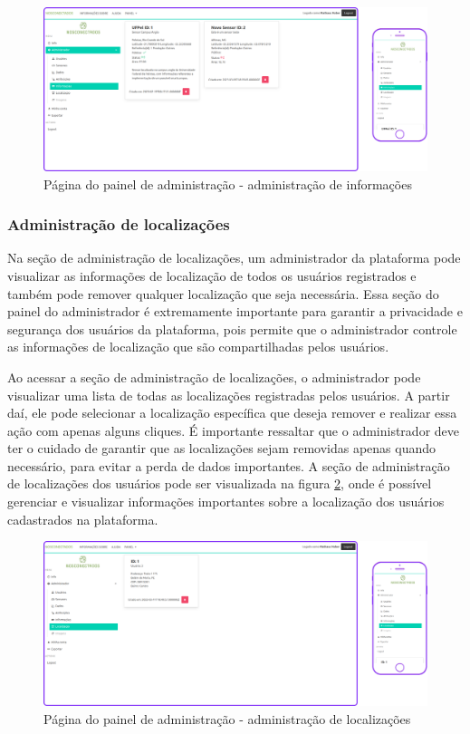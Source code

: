 \documentclass[tcc,capa]{texufpel}
\begin{document}
\begin{figure}[htbp]
  \centering \includegraphics[scale=.2]{assets/painelinformacoes.png}
  \caption{Página do painel de administração - administração de informações}
  \label{admin_informacoes}
\end{figure}
\subsubsection{Administração de localizações}
Na seção de administração de localizações, um administrador da plataforma pode visualizar as informações de localização de todos os usuários registrados e também pode remover qualquer localização que seja necessária. Essa seção do painel do administrador é extremamente importante para garantir a privacidade e segurança dos usuários da plataforma, pois permite que o administrador controle as informações de localização que são compartilhadas pelos usuários.

Ao acessar a seção de administração de localizações, o administrador pode visualizar uma lista de todas as localizações registradas pelos usuários. A partir daí, ele pode selecionar a localização específica que deseja remover e realizar essa ação com apenas alguns cliques. É importante ressaltar que o administrador deve ter o cuidado de garantir que as localizações sejam removidas apenas quando necessário, para evitar a perda de dados importantes. A seção de administração de localizações dos usuários pode ser visualizada na figura \ref{admin_localizacoes}, onde é possível gerenciar e visualizar informações importantes sobre a localização dos usuários cadastrados na plataforma.
\begin{figure}[htbp]
  \centering \includegraphics[scale=.2]{assets/painellocalizacoes.png}
  \caption{Página do painel de administração - administração de localizações}
  \label{admin_localizacoes}
\end{figure}
\end{document}
